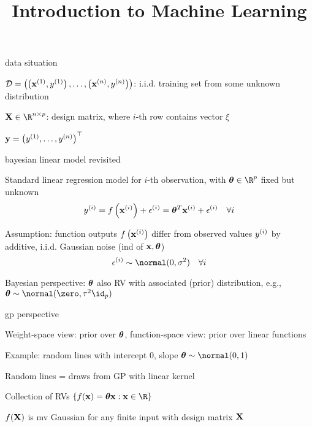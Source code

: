 \documentclass[11pt,compress,t,notes=noshow, xcolor=table]{beamer}
\title{Introduction to Machine Learning}
\begin{document}


\begin{framei}{data situation}
\item $\mathcal{D} = \left( \left(\mathbf{x}^{(1)}, y^{(1)}\right), \ldots, \left(\mathbf{x}^{(n)}, y^{(n)}\right)\right)$: i.i.d. training set from some unknown distribution
\item $\Xmat \in \R^{n \times p}$: design matrix, where $i$-th row contains vector $\xi$
\item $\mathbf{y} = \left(y^{(1)}, \hdots, y^{(n)}\right)^\top$
\end{framei}

\begin{framei}[sep=L]{bayesian linear model revisited}
\item Standard linear regression model for $i$-th observation, with $\thetav \in \R^p$ fixed but unknown
$$y^{(i)} = f\left(\mathbf{x}^{(i)}\right) + \epsilon^{(i)} = \bm{\theta}^T \mathbf{x}^{(i)} + \epsilon^{(i)} \quad \forall i$$
\item Assumption: function outputs $f\left(\mathbf{x}^{(i)}\right)$ differ from observed values $y^{(i)}$ by additive, i.i.d. Gaussian noise (ind of $\mathbf{x}, \bm{\theta}$)
$$\epsi \sim \normal(0, \sigma^2) \quad \forall i$$ 
\item Bayesian perspective: $\bm{\theta}$ also RV with associated (prior) distribution, e.g., $\thetav \sim \normal(\zero, \tau^2 \id_p)$
\end{framei}

\begin{framei}{gp perspective}
\item Weight-space view: prior over $\bm{\theta}$, function-space view: prior over linear functions
\item Example: random lines with intercept 0, slope $\thetav \sim \normal(0, 1)$
\vfill
\item Random lines = draws from GP with linear kernel
\item Collection of RVs $\{ \fx = \thetav \xv: \xv \in \R\}$\item $f(\mathbf{X})$ is mv Gaussian for any finite input with design matrix $\mathbf{X}$
\end{framei}
\end{document}
